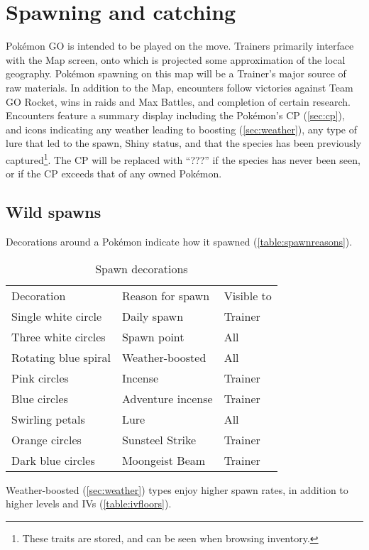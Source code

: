 \chapter{Spawning and catching\label{chap:spawn}}
Pokémon GO is intended to be played on the move.
Trainers primarily interface with the Map screen, onto which is projected
  some approximation of the local geography.
Pokémon spawning on this map will be a Trainer's major source of raw materials.
In addition to the Map, encounters follow victories against Team GO Rocket,
  wins in raids and Max Battles, and completion of certain research.
Encounters feature a summary display including the Pokémon's CP (\autoref{sec:cp}),
  and icons indicating any weather leading to boosting (\autoref{sec:weather}),
  any type of lure that led to the spawn,
  Shiny status,
  and that the species has been previously captured\footnote{These traits are stored, and can be seen when browsing inventory.}.
The CP will be replaced with ``???'' if the species has never been seen, or if
  the CP exceeds that of any owned Pokémon.

\section{Wild spawns\label{sec:spawns}}
Decorations around a Pokémon indicate how it spawned (\autoref{table:spawnreasons}).
\begin{table}
\centering
\begin{tabular}{lll}
  Decoration & Reason for spawn & Visible to\\
\Midrule
  Single white circle & Daily spawn & Trainer\\
  Three white circles & Spawn point & All\\
  Rotating blue spiral & Weather-boosted & All\\
  Pink circles & Incense & Trainer\\
  Blue circles & Adventure incense & Trainer\\
  Swirling petals & Lure & All\\
  Orange circles & Sunsteel Strike & Trainer\\
  Dark blue circles & Moongeist Beam & Trainer\\
\end{tabular}
  \caption{Spawn decorations\label{table:spawnreasons}}
\end{table}
Weather-boosted (\autoref{sec:weather}) types enjoy higher spawn rates,
  in addition to higher levels and IVs (\autoref{table:ivfloors}).

